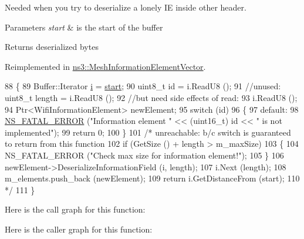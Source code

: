 Needed when you try to deserialize a lonely IE inside other header. 


\begin{DoxyParams}{Parameters}
{\em start} & is the start of the buffer\\
\hline
\end{DoxyParams}
\begin{DoxyReturn}{Returns}
deserialized bytes 
\end{DoxyReturn}


Reimplemented in \hyperlink{classns3_1_1MeshInformationElementVector_afc490f34bbbeb9cf3738fc8a491c38f7}{ns3\+::\+Mesh\+Information\+Element\+Vector}.


\begin{DoxyCode}
88 \{
89   Buffer::Iterator \hyperlink{bernuolliDistribution_8m_a6f6ccfcf58b31cb6412107d9d5281426}{i} = \hyperlink{namespacevisualizer_1_1core_a2a35e5d8a34af358b508dac8635754e0}{start};
90   uint8\_t \textcolor{keywordtype}{id} = i.ReadU8 ();
91   \textcolor{comment}{//unused: uint8\_t length = i.ReadU8 ();}
92   \textcolor{comment}{//but need side effects of read:}
93   i.ReadU8 ();
94   Ptr<WifiInformationElement> newElement;
95   \textcolor{keywordflow}{switch} (\textcolor{keywordtype}{id})
96     \{
97     \textcolor{keywordflow}{default}:
98       \hyperlink{group__fatal_ga5131d5e3f75d7d4cbfd706ac456fdc85}{NS\_FATAL\_ERROR} (\textcolor{stringliteral}{"Information element "} << (uint16\_t) \textcolor{keywordtype}{id} << \textcolor{stringliteral}{" is not implemented"});
99       \textcolor{keywordflow}{return} 0;
100     \}
101   \textcolor{comment}{/*  unreachable:  b/c switch is guaranteed to return from this function}
102 \textcolor{comment}{  if (GetSize () + length > m\_maxSize)}
103 \textcolor{comment}{    \{}
104 \textcolor{comment}{      NS\_FATAL\_ERROR ("Check max size for information element!");}
105 \textcolor{comment}{    \}}
106 \textcolor{comment}{  newElement->DeserializeInformationField (i, length);}
107 \textcolor{comment}{  i.Next (length);}
108 \textcolor{comment}{  m\_elements.push\_back (newElement);}
109 \textcolor{comment}{  return i.GetDistanceFrom (start);}
110 \textcolor{comment}{  */}
111 \}
\end{DoxyCode}


Here is the call graph for this function\+:




Here is the caller graph for this function\+:


